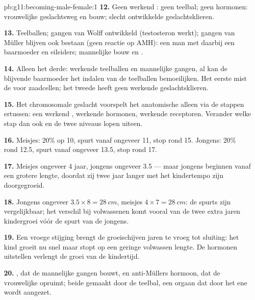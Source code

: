 \begin{solution}{pb:g11:becoming-male-female:1}
\textbf{12.} Geen werkend : geen teelbal; geen hormonen: vrouwelijke
geslachtsweg en bouw; slecht ontwikkelde geslachtsklieren.

\textbf{13.} Teelballen; gangen van Wolff ontwikkeld (testosteron werkt);
gangen van Müller blijven ook bestaan (geen reactie op AMH): een man met
daarbij een baarmoeder en eileiders; mannelijke bouw en .

\textbf{14.} Alleen het derde: werkende teelballen en mannelijke gangen,
al kan de blijvende baarmoeder het indalen van de teelballen bemoeilijken.
Het eerste mist de  voor zaadcellen; het tweede heeft geen werkende
geslachtsklieren.

\textbf{15.} Het chromosomale geslacht voorspelt het anatomische alleen
via de stappen ertussen: een werkend , werkende hormonen, werkende
receptoren. Verander welke stap dan ook en de twee niveaus lopen uiteen.

\textbf{16.} Meisjes: 20\% op 10, spurt vanaf ongeveer 11, stop rond 15.
Jongens: 20\% rond 12.5, spurt vanaf ongeveer 13.5, stop rond 17.

\textbf{17.} Meisjes ongeveer 4 jaar, jongens ongeveer 3.5 --- maar
jongens beginnen vanaf een grotere lengte, doordat zij twee jaar langer
met het kindertempo zijn doorgegroeid.

\textbf{18.} Jongens ongeveer $3.5 \times 8 = \qty{28}{cm}$, meisjes $4 \times
7 = \qty{28}{cm}$: de spurts zijn vergelijkbaar; het verschil
bij volwassenen komt vooral van de twee extra jaren kindergroei vóór de
spurt van de jongens.

\textbf{19.} Een vroege stijging brengt de groeischijven jaren te vroeg
tot sluiting: het kind groeit nu snel maar stopt op een geringe volwassen
lengte. De hormonen uitstellen verlengt de groei van de kindertijd.

\textbf{20.} , dat de mannelijke gangen bouwt, en
anti-Müllers hormoon, dat de vrouwelijke opruimt; beide gemaakt door de
teelbal, een orgaan dat door het ene   wordt aangezet.
\end{solution}
